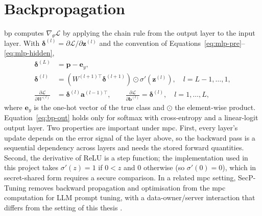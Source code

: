 \section{Backpropagation}\label{sec:bg-bp}
\ac{bp} computes $\nabla_\theta\mathcal{L}$ by applying the chain rule from the output layer to the input layer. With $\boldsymbol{\delta}^{(l)}=\partial\mathcal{L}/\partial\mathbf{z}^{(l)}$ and the convention of Equations~\eqref{eq:mlp-pre}--\eqref{eq:mlp-hidden},
\begin{align}
  \boldsymbol{\delta}^{(L)} &= \mathbf{p} - \mathbf{e}_y, \label{eq:bp-out}\\
  \boldsymbol{\delta}^{(l)} &= \left(W^{(l+1)\top}\boldsymbol{\delta}^{(l+1)}\right)\odot\sigma'\!\left(\mathbf{z}^{(l)}\right), \quad l=L-1,\dots,1, \label{eq:bp-hidden}\\
  \frac{\partial\mathcal{L}}{\partial W^{(l)}} &= \boldsymbol{\delta}^{(l)}\mathbf{a}^{(l-1)\top}, \qquad
  \frac{\partial\mathcal{L}}{\partial \mathbf{b}^{(l)}} = \boldsymbol{\delta}^{(l)}, \quad l=1,\dots,L, \label{eq:bp-grad}
\end{align}
where $\mathbf{e}_y$ is the one-hot vector of the true class and $\odot$ the element-wise product. Equation~\eqref{eq:bp-out} holds only for softmax with cross-entropy and a linear-logit output layer. Two properties are important under \ac{mpc}. First, every layer's update depends on the error signal of the layer above, so the backward pass is a sequential dependency across layers and needs the stored forward quantities. Second, the derivative of ReLU is a step function; the implementation used in this project takes $\sigma'(z)=1$ if $0<z$ and $0$ otherwise (so $\sigma'(0)=0$), which in secret-shared form requires a secure comparison. In a related \ac{mpc} setting, SecP-Tuning removes backward propagation and optimisation from the \ac{mpc} computation for LLM prompt tuning, with a data-owner/server interaction that differs from the setting of this thesis \cite{luo2026secptuning}.

